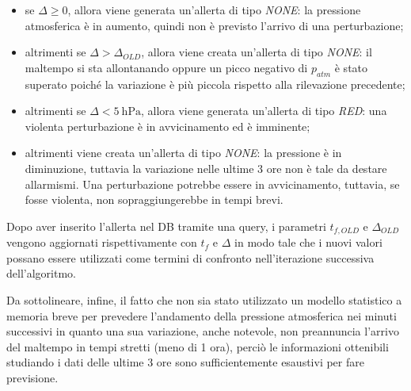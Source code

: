 \begin{itemize}
	\item se $\Delta \ge 0$, allora viene generata un'allerta di tipo \textit{NONE}: la pressione atmosferica è in aumento, quindi non è previsto l'arrivo di una perturbazione;
	\item altrimenti se $\Delta > \Delta_{OLD}$, allora viene creata un'allerta di tipo \textit{NONE}: il maltempo si sta allontanando oppure un picco negativo di $p_{atm}$ è stato superato poiché la variazione è più piccola rispetto alla rilevazione precedente;
	\item altrimenti se $\Delta < \SI{5}{\hecto\pascal}$, allora viene generata un'allerta di tipo \textit{RED}: una violenta perturbazione è in avvicinamento ed è imminente;
	\item altrimenti viene creata un'allerta di tipo \textit{NONE}: la pressione è in diminuzione, tuttavia la variazione nelle ultime 3 ore non è tale da destare allarmismi. Una perturbazione potrebbe essere in avvicinamento, tuttavia, se fosse violenta, non sopraggiungerebbe in tempi brevi.
\end{itemize}
Dopo aver inserito l'allerta nel DB tramite una query, i parametri $t_{f,OLD}$ e $\Delta_{OLD}$ vengono aggiornati rispettivamente con $t_f$ e $\Delta$ in modo tale che i nuovi valori possano essere utilizzati come termini di confronto nell'iterazione successiva dell'algoritmo. 
\par Da sottolineare, infine, il fatto che non sia stato utilizzato un modello statistico a memoria breve per prevedere l'andamento della pressione atmosferica nei minuti successivi in quanto una sua variazione, anche notevole, non preannuncia l'arrivo del maltempo in tempi stretti (meno di 1 ora), perciò le informazioni ottenibili studiando i dati delle ultime 3 ore sono sufficientemente esaustivi per fare previsione. 

